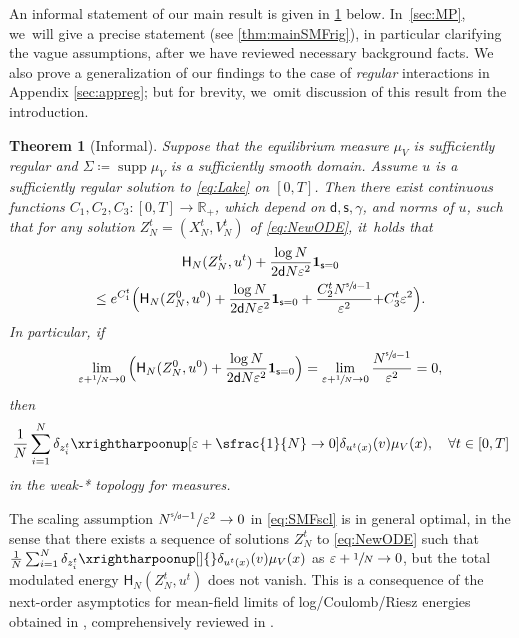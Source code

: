 \documentclass[10pt]{amsart}
\theoremstyle{plain}
\newtheorem{thm}{Theorem}[section]
\theoremstyle{definition}
\DeclareMathOperator{\supp}{supp}
\newcommand{\R}{{\mathbb{R}}}
\let\ga\gamma
\let\vep\varepsilon
\let\uz Z
\newcommand{\indic}{\mathbf{1}}
\newcommand{\Hr}{\mathsf{H}}
\renewcommand{\d}{\mathsf{d}}
\newcommand{\s}{\mathsf{s}}
\begin{document}
An informal statement of our main result is given in \cref{thm:mainSMF} below. In~\cref{sec:MP}, we~will give a precise statement (see \cref{thm:mainSMFrig}), in particular clarifying the vague assumptions, after we have reviewed necessary background facts. We also prove a generalization of our findings to the case of \emph{regular} interactions in Appendix \ref{sec:appreg}; but for brevity, we~omit discussion of this result from the introduction.

\begin{thm}[Informal]\label{thm:mainSMF}
Suppose that the equilibrium measure $\mu_V$ is sufficiently regular and $\Sigma\coloneqq\supp \mu_V$ {is a sufficiently smooth domain}. Assume $u$ is a sufficiently regular solution to \eqref{eq:Lake} on $[0,T]$. Then there exist continuous functions $C_1,C_2,C_3: [0,T]\to \R_+$, which depend on $\d,\s, \ga$, and norms of $u$, such that for any solution $Z_N^t = (X_N^t, V_N^t)$ of \eqref{eq:NewODE}, it~holds that
\begin{multline}\label{eq:mainSMF}
\Hr_{N}(\uz_N^t, u^t) + \frac{\log N}{2\d N\vep^2}\indic_{\s=0}\\
\leq e^{C_1^t}\Big(\Hr_{N}(\uz_N^0, u^0) +\frac{\log N}{2\d N\vep^2}\indic_{\s=0} + \frac{C_2^tN^{\sfrac{\s}{\d}-1}}{\vep^2} {+ C_3^t\vep^2} \Big).
\end{multline}
In particular, if
\begin{equation}\label{eq:SMFscl}
\lim_{\vep+\sfrac{1}{N}\to 0} \Big(\Hr_{N}(\uz_N^0,u^0) + \frac{\log N}{2\d N\vep^2}\indic_{\s=0}\Big) = \lim_{\vep+\sfrac{1}{N}\to 0} \frac{N^{\sfrac{\s}{\d}-1}}{\vep^2} =0,
\end{equation}
then
\begin{equation}\label{eq:SMFweak}
\frac1N\sum_{i=1}^N\delta_{z_i^t} \xrightharpoonup[\vep+\sfrac{1}{N}\to 0]{} \delta_{u^t(x)}(v)\mu_V(x), \quad \forall t\in [0,T]
\end{equation}
in the weak-* topology for measures.
\end{thm}

The scaling assumption $N^{\sfrac{\s}{\d}-1}/\vep^2\to 0$ in \eqref{eq:SMFscl} is in general optimal, in the sense that there exists a sequence of solutions $\uz_N^t$ to \eqref{eq:NewODE} such that ${\frac1N\sum_{i=1}^N \delta_{z_i^t}} \xrightharpoonup[]{} \delta_{u^t(x)}(v)\mu_V(x)$ as $\vep+\sfrac1N\to 0$, but the total modulated energy $\Hr_{N}(\uz_N^t,u^t)$ does not vanish. This is a consequence of the next-order asymptotics for mean-field limits of log/Coulomb/Riesz energies obtained in \cite{SS2015,SS2015log,RS2016,PS2017}, comprehensively reviewed in \cite{SerfatyLN}.
\end{document}
